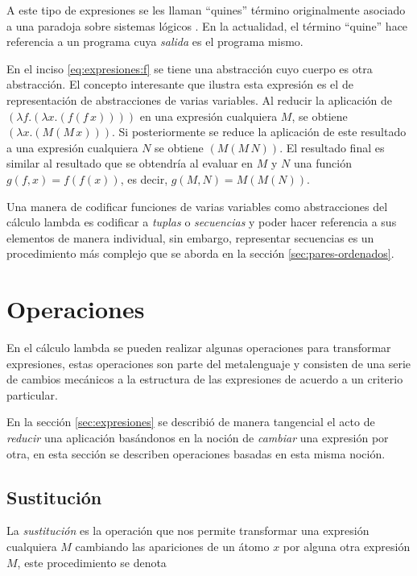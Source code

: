 A este tipo de expresiones se les llaman ``quines'' \cite[pp.~431--437]{Hofstadter:GEB} término originalmente asociado a una paradoja sobre sistemas lógicos \cite{Quine:Paradox}. En la actualidad, el término ``quine'' hace referencia a un programa cuya \emph{salida} es el programa mismo.

En el inciso \eqref{eq:expresiones:f} se tiene una abstracción cuyo cuerpo es otra abstracción. El concepto interesante que ilustra esta expresión es el de representación de abstracciones de varias variables. Al reducir la aplicación de \( (λf.(λx.(f(f\, x)))) \) en una expresión cualquiera \( M \), se obtiene \( (λx.(M(M\, x))) \). Si posteriormente se reduce la aplicación de este resultado a una expresión cualquiera \( N \) se obtiene \( (M(M\, N)) \). El resultado final es similar al resultado que se obtendría al evaluar en \( M \) y \( N \) una función \( g(f,x) = f(f(x)) \), es decir, \( g(M,N) = M(M(N)) \).

Una manera de codificar funciones de varias variables como abstracciones del cálculo lambda es codificar a \emph{tuplas} o \emph{secuencias} y poder hacer referencia a sus elementos de manera individual, sin embargo, representar secuencias es un procedimiento más complejo que se aborda en la sección \ref{sec:pares-ordenados}.

\section{Operaciones}
\label{sec:operaciones}

En el cálculo lambda se pueden realizar algunas operaciones para transformar expresiones, estas operaciones son parte del metalenguaje y consisten de una serie de cambios mecánicos a la estructura de las expresiones de acuerdo a un criterio particular.

En la sección \ref{sec:expresiones} se describió de manera tangencial el acto de \emph{reducir} una aplicación basándonos en la noción de \emph{cambiar} una expresión por otra, en esta sección se describen operaciones basadas en esta misma noción.

\subsection{Sustitución}
\label{sec:op-sustitucion}

La \emph{sustitución} es la operación que nos permite transformar una expresión cualquiera \( M \) cambiando las apariciones de un átomo \( x \) por alguna otra expresión \( M \), este procedimiento se denota


